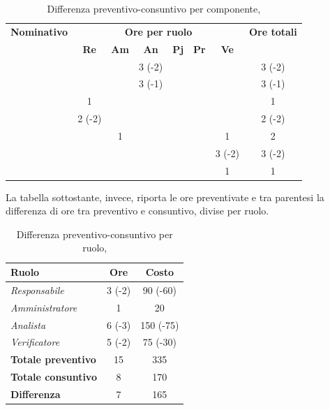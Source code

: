 \begin{table}[H]
	\begin{center}
		\begin{tabular}{|c|c|c|c|c|c|c|c|}
			\hline
			\textbf{Nominativo} & \multicolumn{6}{c|}{\textbf{Ore per ruolo}} & \textbf{Ore totali} \\
			& \textbf{Re} & \textbf{Am} & \textbf{An} & \textbf{Pj} & \textbf{Pr} & \textbf{Ve} & \\
			\hline
			\FB			&			&		&	3 (-2)	&		&		&			&	3 (-2)	\\
			\hline
			\AF			&			&		&	3 (-1)	&	 	&		&			& 	3 (-1)		\\
			\hline
			\GN			&	1 		&		&			&		&		&			&	1		\\
			\hline
			\GR			&	2 (-2)	&	 	&	 		&		&	 	& 			&	2 (-2)	\\
			\hline
			\SM 		&			&	1	&			&		&		& 	1		&	2		\\
			\hline
			\MP			& 			&		&			&		&		&	3 (-2)	&	3 (-2)	\\
			\hline
			\MV 		&			&		&			&		&		&	1		& 	1		\\
			\hline
		\end{tabular}
	\end{center}
	\caption{Differenza preventivo-consuntivo per componente, \AD}
\end{table}

La tabella sottostante, invece, riporta le ore preventivate e  tra parentesi la differenza di ore tra preventivo e consuntivo, divise per ruolo.

\begin{table}[H]
	\begin{center}
		\begin{tabular}{|l|c|c|}
			\hline
			\textbf{Ruolo}	& \textbf{Ore} & \textbf{Costo} \\
			\hline
			\textit{Responsabile}		&	3 (-2)	&	90 (-60) 	\\
			\hline
			\textit{Amministratore}		&	1		&	20 			\\
			\hline
			\textit{Analista}			&	6 (-3)	&	150 (-75) 	\\
			\hline
			\textit{Verificatore}		&	5 (-2)	&	75 (-30)	\\
			\hline
			\textbf{Totale preventivo}	&	15		& 	335			\\
			\hline
			\textbf{Totale consuntivo}	&	8		&  	170			\\
			\hline
			\textbf{Differenza} 		&	7		&	165			\\
			\hline
		\end{tabular}
	\end{center}
	\caption{Differenza preventivo-consuntivo per ruolo, \AD}
\end{table}

